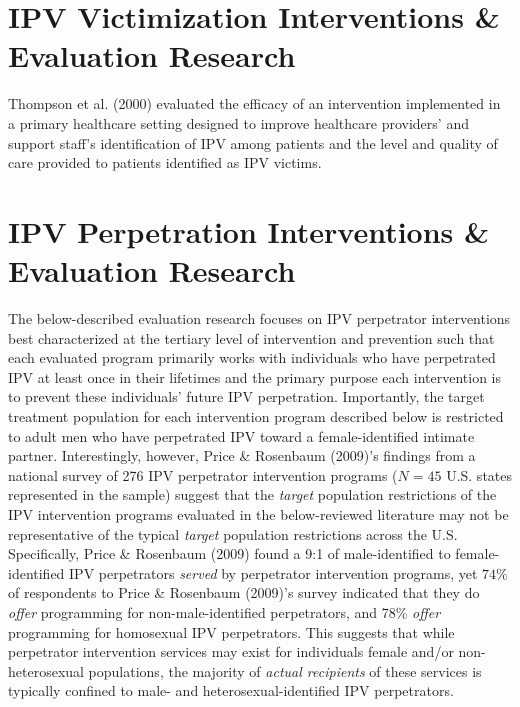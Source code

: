 \documentclass[11pt,]{tufte-book}
\begin{document}
\chapter{IPV Victimization Interventions \& Evaluation
Research}\label{ipv-victimization-interventions-evaluation-research}

Thompson et al. (2000) evaluated the efficacy of an intervention
implemented in a primary healthcare setting designed to improve
healthcare providers' and support staff's identification of IPV among
patients and the level and quality of care provided to patients
identified as IPV victims.

\chapter{IPV Perpetration Interventions \& Evaluation
Research}\label{ipv-perpetration-interventions-evaluation-research}

The below-described evaluation research focuses on IPV perpetrator
interventions best characterized at the tertiary level of intervention
and prevention such that each evaluated program primarily works with
individuals who have perpetrated IPV at least once in their lifetimes
and the primary purpose each intervention is to prevent these
individuals' future IPV perpetration. Importantly, the target treatment
population for each intervention program described below is restricted
to adult men who have perpetrated IPV toward a female-identified
intimate partner. Interestingly, however, Price \& Rosenbaum (2009)'s
findings from a national survey of 276 IPV perpetrator intervention
programs (\(N = 45\) U.S. states represented in the sample) suggest that
the \emph{target} population restrictions of the IPV intervention
programs evaluated in the below-reviewed literature may not be
representative of the typical \emph{target} population restrictions
across the U.S. Specifically, Price \& Rosenbaum (2009) found a 9:1 of
male-identified to female-identified IPV perpetrators \emph{served} by
perpetrator intervention programs, yet \(74\%\) of respondents to Price
\& Rosenbaum (2009)'s survey indicated that they do \emph{offer}
programming for non-male-identified perpetrators, and 78\% \emph{offer}
programming for homosexual IPV perpetrators. This suggests that while
perpetrator intervention services may exist for individuals female
and/or non-heterosexual populations, the majority of \emph{actual
recipients} of these services is typically confined to male- and
heterosexual-identified IPV perpetrators.
\end{document}
